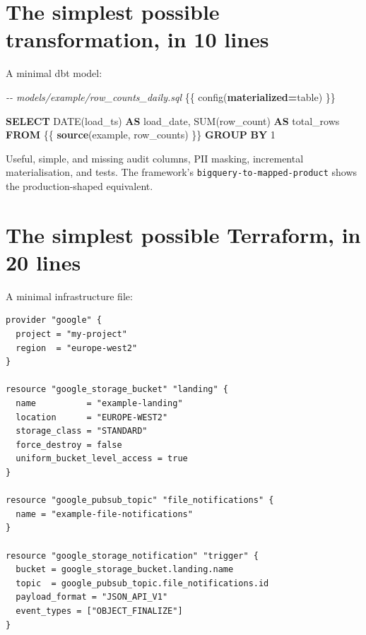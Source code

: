 \documentclass[
  11pt,
  british,
  oneside]{book}
\newenvironment{Shaded}{\begin{snugshade}}{\end{snugshade}}
\newcommand{\CommentTok}[1]{\textcolor[rgb]{0.56,0.35,0.01}{\textit{#1}}}
\newcommand{\DataTypeTok}[1]{\textcolor[rgb]{0.13,0.29,0.53}{#1}}
\newcommand{\DecValTok}[1]{\textcolor[rgb]{0.00,0.00,0.81}{#1}}
\newcommand{\FunctionTok}[1]{\textcolor[rgb]{0.00,0.00,0.00}{#1}}
\newcommand{\KeywordTok}[1]{\textcolor[rgb]{0.13,0.29,0.53}{\textbf{#1}}}
\newcommand{\NormalTok}[1]{#1}
\newcommand{\OperatorTok}[1]{\textcolor[rgb]{0.81,0.36,0.00}{\textbf{#1}}}
\newcommand{\StringTok}[1]{\textcolor[rgb]{0.31,0.60,0.02}{#1}}
\begin{document}
\hypertarget{the-simplest-possible-transformation-in-10-lines}{%
\section{The simplest possible transformation, in 10
lines}\label{the-simplest-possible-transformation-in-10-lines}}

A minimal dbt model:

\begin{Shaded}
\begin{Highlighting}[]
\CommentTok{{-}{-} models/example/row\_counts\_daily.sql}
\NormalTok{\{\{ config(}\KeywordTok{materialized}\OperatorTok{=}\StringTok{\textquotesingle{}table\textquotesingle{}}\NormalTok{) \}\}}

\KeywordTok{SELECT}
    \DataTypeTok{DATE}\NormalTok{(load\_ts) }\KeywordTok{AS}\NormalTok{ load\_date,}
    \FunctionTok{SUM}\NormalTok{(row\_count) }\KeywordTok{AS}\NormalTok{ total\_rows}
\KeywordTok{FROM}\NormalTok{ \{\{ }\KeywordTok{source}\NormalTok{(}\StringTok{\textquotesingle{}example\textquotesingle{}}\NormalTok{, }\StringTok{\textquotesingle{}row\_counts\textquotesingle{}}\NormalTok{) \}\}}
\KeywordTok{GROUP} \KeywordTok{BY} \DecValTok{1}
\end{Highlighting}
\end{Shaded}

Useful, simple, and missing audit columns, PII masking, incremental
materialisation, and tests. The framework's
\texttt{bigquery-to-mapped-product} shows the production-shaped
equivalent.

\hypertarget{the-simplest-possible-terraform-in-20-lines}{%
\section{The simplest possible Terraform, in 20
lines}\label{the-simplest-possible-terraform-in-20-lines}}

A minimal infrastructure file:

\begin{verbatim}
provider "google" {
  project = "my-project"
  region  = "europe-west2"
}

resource "google_storage_bucket" "landing" {
  name          = "example-landing"
  location      = "EUROPE-WEST2"
  storage_class = "STANDARD"
  force_destroy = false
  uniform_bucket_level_access = true
}

resource "google_pubsub_topic" "file_notifications" {
  name = "example-file-notifications"
}

resource "google_storage_notification" "trigger" {
  bucket = google_storage_bucket.landing.name
  topic  = google_pubsub_topic.file_notifications.id
  payload_format = "JSON_API_V1"
  event_types = ["OBJECT_FINALIZE"]
}
\end{verbatim}
\end{document}
